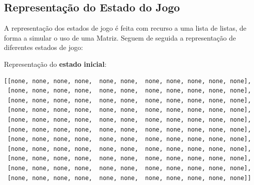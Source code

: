 \documentclass[a4paper]{article}
\begin{document}
\subsection{Representação do Estado do Jogo}

A representação dos estados de jogo é feita com recurso a uma lista de listas, de forma a simular o uso de uma Matriz. Seguem de seguida a representação de diferentes estados de jogo:\newline


Representação do \textbf{estado inicial}:

\begin{small}
\begin{lstlisting}
[[none, none, none, none,  none, none,  none, none, none, none, none],
 [none, none, none, none,  none, none,  none, none, none, none, none],
 [none, none, none, none,  none, none,  none, none, none, none, none],
 [none, none, none, none,  none, none,  none, none, none, none, none],
 [none, none, none, none,  none, none,  none, none, none, none, none],
 [none, none, none, none,  none, none,  none, none, none, none, none],
 [none, none, none, none,  none, none,  none, none, none, none, none],
 [none, none, none, none,  none, none,  none, none, none, none, none],
 [none, none, none, none,  none, none,  none, none, none, none, none],
 [none, none, none, none,  none, none,  none, none, none, none, none],
 [none, none, none, none,  none, none,  none, none, none, none, none]]
\end{lstlisting}
\end{small}
\end{document}
